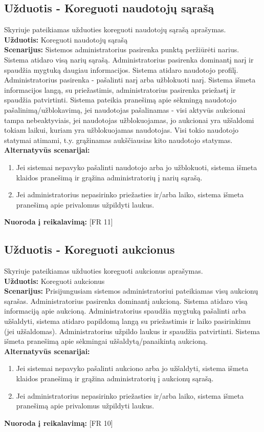 \documentclass{VUMIFPSkursinis}
\begin{document}
	\subsection{Užduotis - Koreguoti naudotojų sąrašą}
	Skyriuje pateikiamas užduoties koreguoti naudotojų sąrašą aprašymas.\\
	\textbf{Užduotis:}  Koreguoti naudotojų sąrašą \\
	\textbf{Scenarijus:} Sistemos administratorius pasirenka punktą peržiūrėti narius. Sistema atidaro visą narių sąrašą. Administratorius pasirenka dominantį narį ir spaudžia mygtuką daugiau informacijos. Sistema atidaro naudotojo profilį. Administratorius pasirenka - pašalinti narį arba užblokuoti narį. Sistema išmeta informacijos langą, su priežastimis, administratorius pasirenka priežastį ir spaudžia patvirtinti. Sistema pateikia pranešimą apie sėkmingą naudotojo pašalinimą/užblokavimą, jei naudotojas pašalinamas - visi aktyvūs aukcionai tampa nebeaktyviais, jei naudotojas užblokuojamas, jo aukcionai yra užšaldomi tokiam laikui, kuriam yra užblokuojamas naudotojas. Visi tokio naudotojo statymai atimami, t.y. grąžinamas aukščiausias kito naudotojo statymas. \\
	\textbf{Alternatyvūs scenarijai:}
	\begin{enumerate}
		\item Jei sistemai nepavyko pašalinti naudotojo arba jo užblokuoti, sistema išmeta klaidos pranešimą ir grąžina administratorių į narių sąrašą. 
		\item Jei administratorius nepasirinko priežasties ir/arba laiko, sistema išmeta pranešimą apie privalomus užpildyti laukus. 
	\end{enumerate}
	\textbf{Nuoroda į reikalavimą: } [FR 11]
	
	\subsection{Užduotis - Koreguoti aukcionus}
	Skyriuje pateikiamas užduoties koreguoti aukcionus aprašymas.\\
	\textbf{Užduotis:}  Koreguoti aukcionus \\
	\textbf{Scenarijus:} Prisijungusiam sistemos administratoriui pateikiamas visų aukcionų sąrašas. Administratorius pasirenka dominantį aukcioną. Sistema atidaro visą informaciją apie aukcioną. Administratorius spaudžia mygtuką pašalinti arba užšaldyti, sistema atidaro papildomą langą su priežastimis ir laiko pasirinkimu (jei užšaldomas). Administratorius užpildo laukus ir spaudžia patvirtinti. Sistema išmeta pranešimą apie sėkmingai užšaldytą/panaikintą aukcioną.\\
	\textbf{Alternatyvūs scenarijai:}
	\begin{enumerate}
		\item Jei sistemai nepavyko pašalinti aukciono arba jo užšaldyti, sistema išmeta klaidos pranešimą ir grąžina administratorių į aukcionų sąrašą. 
		\item Jei administratorius nepasirinko priežasties ir/arba laiko, sistema išmeta pranešimą apie privalomus užpildyti laukus. 
	\end{enumerate}
	\textbf{Nuoroda į reikalavimą: } [FR 10]
	
\end{document}
